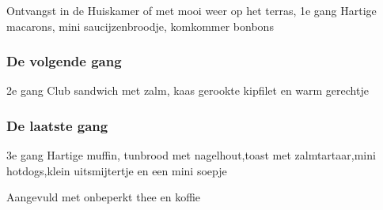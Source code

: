 Ontvangst in de Huiskamer of met mooi weer op het terras,
1e gang Hartige macarons, mini saucijzenbroodje, komkommer bonbons

\subsubsection*{De volgende gang}


2e gang Club sandwich met zalm, kaas gerookte kipfilet en warm gerechtje

\subsubsection*{De laatste gang}
3e gang Hartige muffin, tunbrood met nagelhout,toast met zalmtartaar,mini hotdogs,klein uitsmijtertje en een mini soepje

Aangevuld met onbeperkt thee en koffie